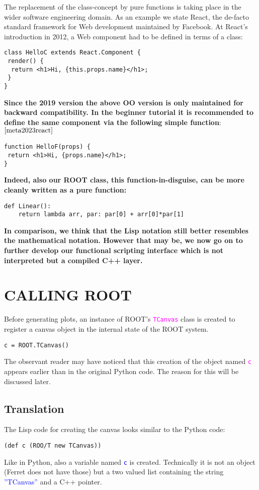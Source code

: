 \documentclass[twocolumn]{article}
\begin{document}
The replacement of the class-concept by pure functions is taking place in the wider software engineering domain. As an example we state React, the de-facto standard framework for Web development maintained by Facebook.
At React’s introduction in 2012, a Web component had to be defined in terms of a class:
{\color{magenta}\begin{verbatim}
class HelloC extends React.Component {
 render() {
  return <h1>Hi, {this.props.name}</h1>;
 }
}
\end{verbatim}}
\textbf{Since the 2019 version the above OO version is only maintained for backward compatibility. In the beginner tutorial it is recommended to define the same component via the following simple function}:$^{\cite{meta2023react}}$
{\color{magenta}\begin{verbatim}
function HelloF(props) {
 return <h1>Hi, {props.name}</h1>;
}
\end{verbatim}}
\textbf{Indeed, also our ROOT class, this function-in-disguise, can be more cleanly written as a pure function:}
{\color{magenta}\begin{verbatim}
def Linear():
    return lambda arr, par: par[0] + arr[0]*par[1]
\end{verbatim}}
\textbf{In comparison, we think that the Lisp notation still better resembles the mathematical notation. However that may be, we now go on to further develop our functional scripting interface which is not interpreted but a compiled C++ layer.}

\section{CALLING ROOT}
Before generating plots, an instance of ROOT’s \texttt{\textcolor{magenta}{TCanvas}}  class is created to register a canvas object in the internal state of the ROOT system.
{\color{magenta}\begin{verbatim}
c = ROOT.TCanvas()
\end{verbatim}}
The observant reader may have noticed that this creation of the object named \texttt{\textcolor{magenta}{c}} appears earlier than in the original Python code. The reason for this will be discussed later.

\subsection{Translation} 
The Lisp code for creating the canvas looks similar to the Python code:
{\color{blue}\begin{verbatim}
(def c (ROO/T new TCanvas))
\end{verbatim}}
Like in Python, also a variable named \texttt{\textcolor{blue}{c}} is created. Technically it is not an object (Ferret does not have those) but a two valued list containing the string \textcolor{blue}{”TCanvas”}  and a C++ pointer.
\end{document}
